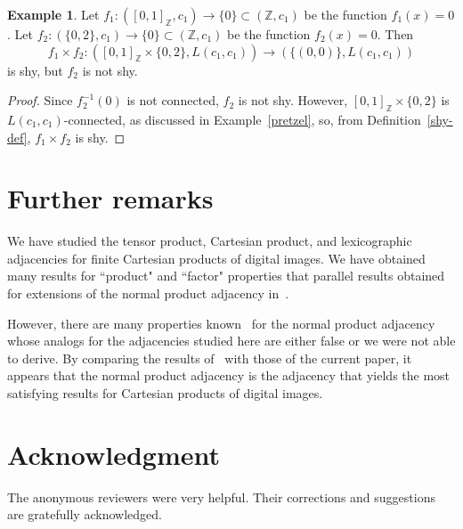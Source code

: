 \documentclass{article}
\theoremstyle{plain}
\theoremstyle{definition}
\newtheorem{exl}[thm]{Example}
\numberwithin{thm}{section}
\def\Z{{\mathbb Z}}
\begin{document}
\begin{exl}
Let $f_1: ([0,1]_{\Z},c_1) \to \{0\} \subset (\Z,c_1)$ be the function
$f_1(x)=0$. Let $f_2: (\{0,2\},c_1) \to \{0\} \subset (\Z,c_1)$ be the function
$f_2(x)=0$. Then
\[ f_1 \times f_2: ([0,1]_{\Z} \times \{0,2\}, L(c_1,c_1)) \to (\{(0,0)\},L(c_1,c_1)) \]
is shy, but $f_2$ is not shy.
\end{exl}

\begin{proof}
Since $f_2^{-1}(0)$ is not connected, $f_2$ is not shy. However,
$[0,1]_{\Z} \times \{0,2\}$ is $L(c_1,c_1)$-connected, as discussed in 
Example~\ref{pretzel}, so, from Definition~\ref{shy-def}, $f_1 \times f_2$ is shy.
\end{proof}

\section{Further remarks}
We have studied the tensor product, Cartesian product, and lexicographic adjacencies for finite Cartesian
products of digital images. We have obtained many results for
``product" and ``factor" properties that parallel
results obtained for extensions
of the normal product adjacency in~\cite{Boxer16a}.

However, there are many properties known~\cite{Boxer16a} for the
normal product adjacency whose analogs for the adjacencies studied
here are either false or we were not able to derive. By comparing the
results of~\cite{Boxer16a} with those of the current paper, it
appears that the normal product adjacency is the adjacency that
yields the most satisfying results for Cartesian products of digital images.

\section{Acknowledgment}
The anonymous reviewers were very helpful. Their
corrections and suggestions are gratefully acknowledged.
\end{document}
